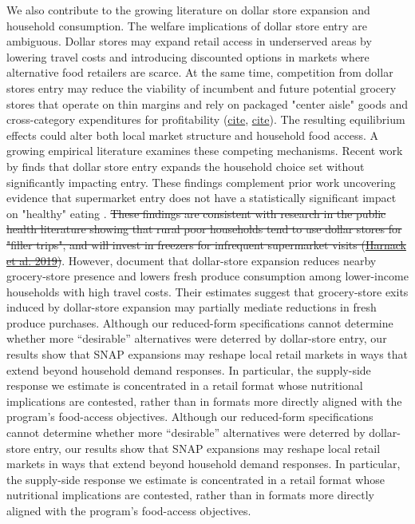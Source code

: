 \documentclass[12pt]{article}
\begin{document}
We also contribute to the growing literature on dollar store expansion and household consumption. The welfare implications of dollar store entry are ambiguous. Dollar stores may expand retail access in underserved areas by lowering travel costs and introducing discounted options in markets where alternative food retailers are scarce. At the same time, competition from dollar stores entry may reduce the viability of incumbent and future potential grocery stores that operate on thin margins and rely on packaged "center aisle" goods and cross-category expenditures for profitability \citep{malinovskaya2026destination}(\href{https://papers.ssrn.com/sol3/papers.cfm?abstract_id=4335935}{cite}, \href{https://www.pdginsights.com/post/inside-the-aisles-why-the-grocery-center-store-is-still-a-strategic-powerhouse}{cite}). The resulting equilibrium effects could alter both local market structure and household food access. A growing empirical literature examines these competing mechanisms. Recent work by  \cite{schneier2025dollarstore} finds that dollar store entry expands the household choice set without significantly impacting entry. These findings complement prior work uncovering evidence that supermarket entry does not have a statistically significant impact on "healthy" eating \citep{allcott2019food}. \sout{These findings are consistent with research in the public health literature showing that rural poor households tend to use dollar stores for "filler trips", and will invest in freezers for infrequent supermarket visits (\href{https://pmc.ncbi.nlm.nih.gov/articles/PMC6836802/}{Harnack et al. 2019})}. However, \cite{caoui2025dollar} document that dollar-store expansion reduces nearby grocery-store presence and lowers fresh produce consumption among lower-income households with high travel costs. Their estimates suggest that grocery-store exits induced by dollar-store expansion may partially mediate reductions in fresh produce purchases. Although our reduced-form specifications cannot determine whether more ``desirable'' alternatives were deterred by dollar-store entry, our results show that SNAP expansions may reshape local retail markets in ways that extend beyond household demand responses. In particular, the supply-side response we estimate is concentrated in a retail format whose nutritional implications are contested, rather than in formats more directly aligned with the program's food-access objectives. Although our reduced-form specifications cannot determine whether more ``desirable'' alternatives were deterred by dollar-store entry, our results show that SNAP expansions may reshape local retail markets in ways that extend beyond household demand responses. In particular, the supply-side response we estimate is concentrated in a retail format whose nutritional implications are contested, rather than in formats more directly aligned with the program's food-access objectives.
\end{document}
